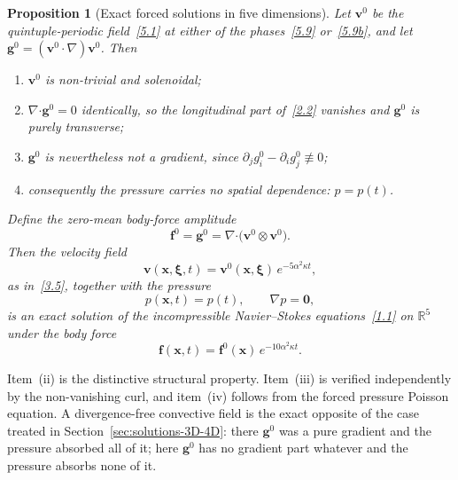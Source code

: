 \documentclass[11pt]{jfm}
\providecommand\bcdot{\boldsymbol{\cdot}}
\newtheorem{proposition}[lemma]{Proposition}
\numberwithin{equation}{section}
\begin{document}
\begin{proposition}[Exact forced solutions in five dimensions]
\label{prop:5D-forced}
Let $\boldsymbol{v}^0$ be the quintuple-periodic field~\eqref{5.1} at either of the
phases~\eqref{5.9} or~\eqref{5.9b}, and let
$\boldsymbol{g}^0=(\boldsymbol{v}^0\!\cdot\!\nabla)\boldsymbol{v}^0$. Then
\begin{enumerate}
\item[\textup{(i)}] $\boldsymbol{v}^0$ is non-trivial and solenoidal;
\item[\textup{(ii)}] $\nabla\bcdot\boldsymbol{g}^0=0$ identically, so the longitudinal part
of~\eqref{2.2} vanishes and $\boldsymbol{g}^0$ is purely transverse;
\item[\textup{(iii)}] $\boldsymbol{g}^0$ is nevertheless not a gradient, since
$\partial_j g_i^0-\partial_i g_j^0\not\equiv0$;
\item[\textup{(iv)}] consequently the pressure carries no spatial dependence: $p=p(t)$.
\end{enumerate}
Define the zero-mean body-force amplitude
\begin{equation}
\label{5.10}
\boldsymbol{f}^0 = \boldsymbol{g}^0
= \nabla\bcdot\bigl(\boldsymbol{v}^0\otimes\boldsymbol{v}^0\bigr).
\end{equation}
Then the velocity field
\begin{equation}
\label{5.forced-v}
\boldsymbol{v}(\boldsymbol{x},\boldsymbol{\xi},t)
=\boldsymbol{v}^0(\boldsymbol{x},\boldsymbol{\xi})\,e^{-5\alpha^2\kappa t},
\end{equation}
as in~\eqref{3.5}, together with the pressure
\begin{equation}
\label{5.forced-p}
p(\boldsymbol{x},t)=p(t),\qquad \nabla p=\boldsymbol{0},
\end{equation}
is an exact solution of the incompressible Navier--Stokes equations~\eqref{1.1} on $\mathbb{R}^5$
under the body force
\begin{equation}
\label{5.forced-f}
\boldsymbol{f}(\boldsymbol{x},t)=\boldsymbol{f}^0(\boldsymbol{x})\,e^{-10\alpha^2\kappa t}.
\end{equation}
\end{proposition}

\noindent Item~(ii) is the distinctive structural property. Item~(iii) is verified independently by
the non-vanishing curl, and item~(iv) follows from the forced pressure Poisson equation. A
divergence-free convective field is the exact opposite of the case treated in
Section~\ref{sec:solutions-3D-4D}: there $\boldsymbol{g}^0$ was a pure gradient and the pressure
absorbed all of it; here $\boldsymbol{g}^0$ has no gradient part whatever and the pressure absorbs
none of it.
\end{document}
